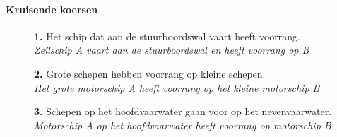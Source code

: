 \paragraph{Kruisende koersen}
\vspace{-0.7cm}
\begin{figure}[H]
	\centering
	\begin{minipage}[t]{0.70\textwidth}
		\textbf{1.} Het schip dat aan de stuurboordswal vaart heeft voorrang.\\
		\textit{Zeilschip A vaart aan de stuurboordswal en heeft voorrang op B}
	\end{minipage}
	\hfill
	\begin{minipage}[t]{0.20\textwidth}
		\label{pic:kr1}
	\end{minipage}
	\hfill
\end{figure}

\vspace{-0.7cm}

\begin{figure}[H]
	\centering
	\begin{minipage}[t]{0.70\textwidth}
		\textbf{2.} Grote schepen hebben voorrang op kleine schepen.\\
		\textit{Het grote motorschip A heeft voorrang op het kleine motorschip B}
	\end{minipage}
	\hfill
	\begin{minipage}[t]{0.20\textwidth}
		\label{pic:kr2}
	\end{minipage}
	\hfill
\end{figure}

\vspace{-0.7cm}
\begin{figure}[H]
	\centering
	\begin{minipage}[t]{0.72\textwidth}
		\textbf{3.} Schepen op het hoofdvaarwater gaan voor op het nevenvaarwater.\\
		\textit{Motorschip A op het hoofdvaarwater heeft voorrang op motorschip B}
	\end{minipage}
	\hfill
	\begin{minipage}[t]{0.20\textwidth}
		\label{pic:kr3}
	\end{minipage}
	\hfill
\end{figure}

